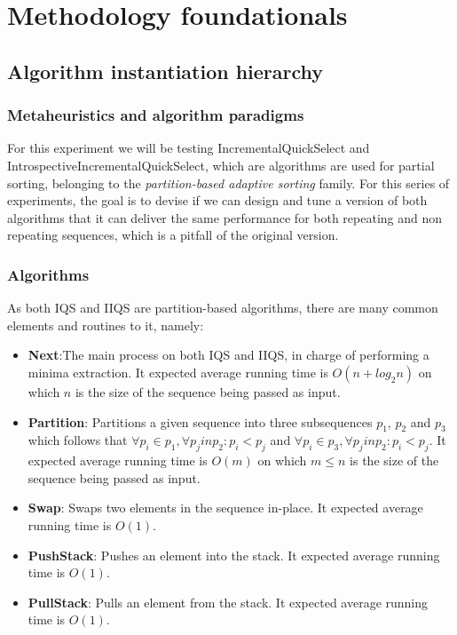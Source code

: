 \section{Methodology foundationals}
\label{SECTION:METHODOLOGY_FOUNDATIONALS}

\subsection{Algorithm instantiation hierarchy}

\subsubsection{Metaheuristics and algorithm paradigms}
For this experiment we will be testing IncrementalQuickSelect and IntrospectiveIncrementalQuickSelect, which are algorithms are used for partial sorting, belonging to the \textit{partition-based adaptive sorting} family. For this series of experiments, the goal is to devise if we can design and tune a version of both algorithms that it can deliver the same performance for both repeating and non repeating sequences, which is a pitfall of the original version.
\subsubsection{Algorithms}
As both IQS and IIQS are partition-based algorithms, there are many common elements and routines to it, namely:

\begin{itemize}
    \item \textbf{Next}:The main process on both IQS and IIQS, in charge of performing a minima extraction. It expected average running time is $O(n + log_2{n})$ on which $n$ is the size of the sequence being passed as input.
    \item \textbf{Partition}: Partitions a given sequence into three subsequences $p_1$, $p_2$ and $p_3$ which follows that $\forall p_i \in p_1, \forall p_j in p_2: p_i < p_j$ and $\forall p_i \in p_3, \forall p_j in p_2: p_i < p_j$. It expected average running time is $O(m)$ on which $m \leq n$ is the size of the sequence being passed as input.
    \item \textbf{Swap}: Swaps two elements in the sequence in-place. It expected average running time is $O(1)$.
    \item \textbf{PushStack}: Pushes an element into the stack. It expected average running time is $O(1)$.
    \item \textbf{PullStack}: Pulls an element from the stack. It expected average running time is $O(1)$.
\end{itemize}

